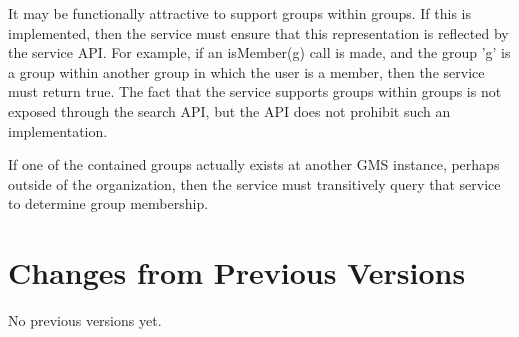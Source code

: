 \documentclass[11pt,a4paper]{ivoa}
\begin{document}
It may be functionally attractive to support groups within groups.  If this is implemented, then the service must ensure that this representation is reflected by the service API.  For example, if an isMember(g) call is made, and the group 'g' is a group within another group in which the user is a member, then the service must return true.  The fact that the service supports groups within groups is not exposed through the search API, but the API does not prohibit such an implementation.

If one of the contained groups actually exists at another GMS instance, perhaps outside of the organization, then the service must transitively query that service to determine group membership.

\appendix

\section{Changes from Previous Versions}

No previous versions yet.


\end{document}
